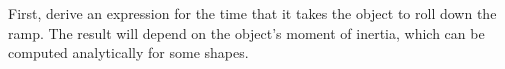 \documentclass[11pt,letterpaper]{article}
\begin{document}


First, derive an expression for the time that it takes the object to roll down the ramp. The result will depend on the object's moment of inertia, which can be computed analytically for some shapes.
\end{document}
